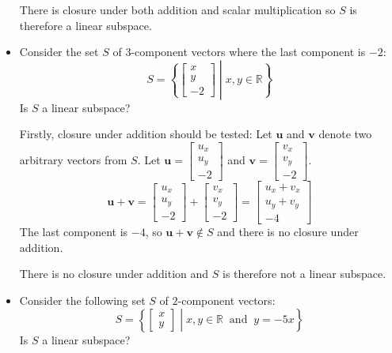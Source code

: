 \documentclass{article}
\begin{document}
\begin{itemize}
There is closure under both addition and scalar multiplication so \(S\) is therefore a linear subspace. 
\item Consider the set \(S\) of \(3\)-component vectors where the last component is \(-2\):
\[S = \left\{\begin{bmatrix} x \\ y \\ -2 \end{bmatrix}\middle| x, y \in \mathbb{R} \right\}\]
Is \(S\) a linear subspace? 

Firstly, closure under addition should be tested:
Let \(\mathbf{u}\) and \(\mathbf{v}\) denote two arbitrary vectors from \(S\). Let \(\mathbf{u} = \begin{bmatrix} u_x \\ u_y \\ -2 \end{bmatrix}\) and \(\mathbf{v} = \begin{bmatrix} v_x \\ v_y \\ -2 \end{bmatrix}\).
\[\mathbf{u} + \mathbf{v} = \begin{bmatrix} u_x \\ u_y \\ -2 \end{bmatrix} + \begin{bmatrix} v_x \\ v_y \\ -2 \end{bmatrix} = \begin{bmatrix} u_x + v_x \\ u_y + v_y \\ -4 \end{bmatrix}\]
The last component is \(-4\), so \(\mathbf{u} + \mathbf{v} \notin S\) and there is no closure under addition. 

There is no closure under addition and \(S\) is therefore not a linear subspace.
\item Consider the following set \(S\) of \(2\)-component vectors:
\[S = \left\{\begin{bmatrix} x \\ y \end{bmatrix}\middle| x, y \in \mathbb{R} \;\;\text{and}\;\; y = -5x \right\}\]
Is \(S\) a linear subspace? 


\end{itemize}
\end{document}
